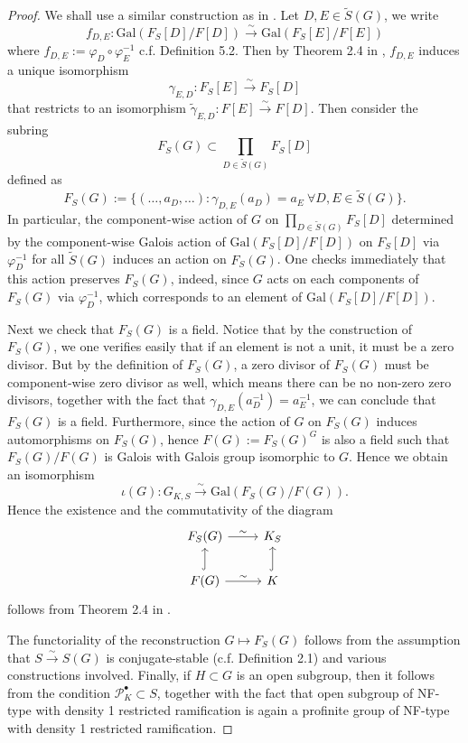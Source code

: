 \documentclass{article}
\theoremstyle{plain}
\theoremstyle{definition}
\theoremstyle{remark}
\begin{document}
\begin{proof}
We shall use a similar construction as in \cite{Ho2}. Let $D,E \in \widetilde{S}(G)$, we write
$$
f_{D,E}: \text{Gal}(F_S[D]/F[D]) \xrightarrow{\sim} \text{Gal}(F_S[E]/F[E])
$$
where $f_{D,E} := \varphi_D \circ \varphi_E^{-1}$ c.f. Definition 5.2. Then by Theorem 2.4 in \cite{Shi2}, $f_{D,E}$ induces a unique isomorphism
$$
\gamma_{E,D}: F_S[E] \xrightarrow{\sim} F_S[D]
$$
that restricts to an isomorphism $\tilde \gamma_{E,D}: F[E] \xrightarrow{\sim} F[D]$. Then consider the subring
$$
F_S(G) \subset \prod_{D \in \widetilde{S}(G)} F_S[D]
$$
defined as
$$
F_S(G) := \{(\dots,a_D,\dots): \gamma_{D,E}(a_D) = a_E~\forall D,E \in \widetilde{S}(G)\}.
$$
In particular, the component-wise action of $G$ on $\prod_{D \in \widetilde{S}(G)}F_S[D]$ determined by the component-wise Galois action of $\text{Gal}(F_S[D]/F[D])$ on $F_S[D]$ via $\varphi_D^{-1}$ for all $\widetilde{S}(G)$ induces an action on $F_S(G)$. One checks immediately that this action preserves $F_S(G)$, indeed, since $G$ acts on each components of $F_S(G)$ via $\varphi_D^{-1}$, which corresponds to an element of $\text{Gal}(F_S[D]/F[D])$. \par 
Next we check that $F_S(G)$ is a field. Notice that by the construction of $F_S(G)$, we one verifies easily that if an element is not a unit, it must be a zero divisor. But by the definition of $F_S(G)$, a zero divisor of $F_S(G)$ must be component-wise zero divisor as well, which means there can be no non-zero zero divisors, together with the fact that $\gamma_{D,E}(a_D^{-1}) = a_E^{-1}$, we can conclude that $F_S(G)$ is a field. Furthermore, since the action of $G$ on $F_S(G)$ induces automorphisms on $F_S(G)$, hence $F(G) := F_S(G)^G$ is also a field such that $F_S(G)/F(G)$ is Galois with Galois group isomorphic to $G$. Hence we obtain an isomorphism
$$
\iota(G): G_{K,S} \xrightarrow{\sim} \text{Gal}(F_S(G)/F(G)).
$$
Hence the existence and the commutativity of the diagram
$$
\begin{tikzcd}
    F_S(G) \arrow[r,"\sim"] & K_S \\
    F(G) \arrow[u,hookrightarrow] \arrow[r,"\sim"] & K \arrow[u,hookrightarrow]
\end{tikzcd}
$$
follows from Theorem 2.4 in \cite{Shi2}. \par 
The functoriality of the reconstruction $G \mapsto F_S(G)$ follows from the assumption that $S \xrightarrow{\sim} S(G)$ is conjugate-stable (c.f. Definition 2.1) and various constructions involved. Finally, if $H \subset G$ is an open subgroup, then it follows from the condition $\mathscr{P}_K^{\bullet} \subset S$, together with the fact that open subgroup of NF-type with density 1 restricted ramification is again a profinite group of NF-type with density 1 restricted ramification.
\end{proof}
\end{document}
